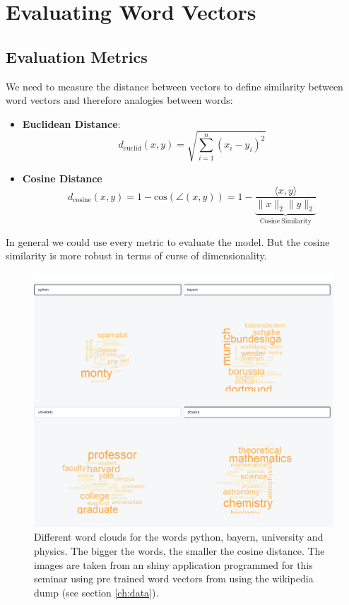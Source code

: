 \chapter{Evaluating Word Vectors}\label{ch:eval}

\section{Evaluation Metrics}

We need to measure the distance between vectors to define similarity between word vectors and therefore analogies between words:

\begin{itemize}
  \item 
    \textbf{Euclidean Distance}: 
    \[
      d_\mathrm{euclid}(x,y) = \sqrt{\sum\limits_{i=1}^n(x_i - y_i)^2}
    \]

  \item 
    \textbf{Cosine Distance}
    \[
      d_\mathrm{cosine}(x,y) = 1 - \mathrm{cos}(\angle (x, y)) = 
      1 - \underbrace{\frac{\langle x,y\rangle}{\|x\|_2\|y\|_2}}_{\mathrm{Cosine\ Similarity}}
    \]
\end{itemize}

In general we could use every metric to evaluate the model. But the 
cosine similarity is more robust in terms of curse of dimensionality.

\begin{figure}[!h]
\centering
\includegraphics[scale=0.5]{images/word_clouds.png} 
\caption[Different word clouds illustrating similarities.]{Different word clouds for the words python, bayern, university and physics. The bigger the words, the smaller the cosine distance. The images are taken from an shiny application programmed for this seminar using pre trained word vectors from \cite{pennington2014glove} using the wikipedia dump (see section \ref{ch:data}).}
\label{fig:wc}
\end{figure}

